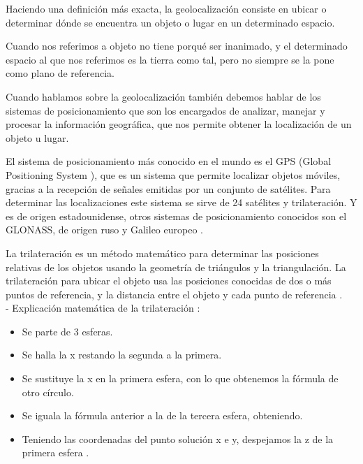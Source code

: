 Haciendo una definición más exacta, la geolocalización consiste en ubicar o determinar dónde se encuentra un objeto o lugar en un determinado espacio.

Cuando nos referimos a objeto no tiene porqué ser inanimado, y el determinado espacio al que nos referimos es la tierra como tal, pero no siempre se la pone como plano de referencia. 

Cuando hablamos sobre la geolocalización también debemos hablar de los sistemas de posicionamiento que son los encargados de analizar, manejar y procesar la información geográfica, que nos permite obtener la localización de un objeto u lugar.

El sistema de posicionamiento más conocido en el mundo es el GPS (Global Positioning System ), que es un sistema que permite localizar objetos móviles, gracias a la recepción de señales emitidas por un conjunto de satélites. Para determinar las localizaciones este sistema se sirve de 24 satélites y trilateración. Y es de origen estadounidense, otros sistemas de posicionamiento conocidos son el GLONASS, de origen ruso y Galileo europeo \cite{wikigps}.

La trilateración es un método matemático para determinar las posiciones relativas de los objetos usando la geometría de triángulos y la triangulación. La trilateración para ubicar el objeto usa las posiciones conocidas de dos o más puntos de referencia, y la distancia entre el objeto y cada punto de referencia \cite{wikitrila}.
\\
- Explicación matemática de la trilateración \cite{wikitrila}:
\begin{itemize}
\item 
	Se parte de 3 esferas.
	\\
\item
	Se halla la x restando la segunda a la primera.
\item
	Se sustituye la x en la primera esfera, con lo que obtenemos la fórmula de otro círculo.
\item
	Se iguala la fórmula anterior a la de la tercera esfera, obteniendo.
\item
	Teniendo las coordenadas del punto solución x e y, despejamos la z de la primera esfera .
\end{itemize}

